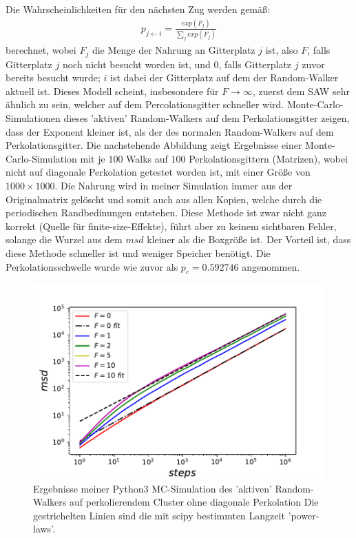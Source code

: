 \documentclass[a4paper, 12pt]{report}
\begin{document}
\noindent Die Wahrscheinlichkeiten für den nächsten Zug werden gemäß:
\begin{align}
p_{j \leftarrow i} = \frac{exp({F_j})}{\sum_j exp({F_j})}
\end{align}
berechnet, wobei $F_j$ die Menge der Nahrung an Gitterplatz $j$ ist, also $F$, falls Gitterplatz $j$ noch nicht besucht worden ist, und $0$, falls Gitterplatz $j$ zuvor bereits besucht wurde; $i$ ist dabei der Gitterplatz auf dem der Random-Walker aktuell ist. Dieses Modell scheint, insbesondere für $F \rightarrow \infty$, zuerst dem SAW sehr ähnlich zu sein, welcher auf dem Percolationsgitter schneller wird. Monte-Carlo-Simulationen dieses 'aktiven' Random-Walkers auf dem Perkolationsgitter zeigen, dass der Exponent kleiner ist, als der des normalen Random-Walkers auf dem Perkolationsgitter. Die nachstehende Abbildung zeigt Ergebnisse einer Monte-Carlo-Simulation mit je $100$ Walks auf $100$ Perkolationsgittern (Matrizen), wobei nicht auf diagonale Perkolation getestet worden ist, mit einer Größe von $1000 \times 1000$. Die Nahrung wird in meiner Simulation immer aus der Originalmatrix gelöscht und somit auch aus allen Kopien, welche durch die periodischen Randbedinungen entstehen. Diese Methode ist zwar nicht ganz korrekt (Quelle für finite-size-Effekte), führt aber zu keinem sichtbaren Fehler, solange die Wurzel aus dem $msd$ kleiner als die Boxgröße ist. Der Vorteil ist, dass diese Methode schneller ist und weniger Speicher benötigt. Die Perkolationsschwelle wurde wie zuvor als $p_c=0.592746$ angenommen.
\begin{figure}[h!]
	\centering
	\includegraphics[scale=0.9]{food.pdf}
	\caption{Ergebnisse meiner Python3 MC-Simulation des 'aktiven' Random-Walkers auf perkolierendem Cluster ohne diagonale Perkolation \break Die gestrichelten Linien sind die mit scipy bestimmten Langzeit 'power-laws'.}
\end{figure}
\newpage
\end{document}
